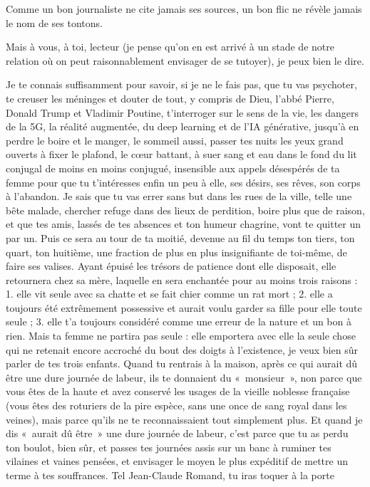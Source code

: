 Comme un bon journaliste ne cite jamais ses sources, un bon flic ne révèle jamais le nom de ses tontons.

Mais à vous, à toi, lecteur (je pense qu’on en est arrivé à un stade de notre relation où on peut raisonnablement envisager de se tutoyer), je peux bien le dire.

Je te connais suffisamment pour savoir, si je ne le fais pas, que tu vas psychoter, te creuser les méninges et douter de tout, y compris de Dieu, l’abbé Pierre, Donald Trump et Vladimir Poutine, t’interroger sur le sens de la vie, les dangers de la 5G, la réalité augmentée, du deep learning et de l’IA générative, jusqu’à en perdre le boire et le manger, le sommeil aussi, passer tes nuits les yeux grand ouverts à fixer le plafond, le cœur battant, à suer sang et eau dans le fond du lit conjugal de moins en moins conjugué, insensible aux appels désespérés de ta femme pour que tu t’intéresses enfin un peu à elle, ses désirs, ses rêves, son corps à l’abandon. Je sais que tu vas errer sans but dans les rues de la ville, telle une bête malade, chercher refuge dans des lieux de perdition, boire plus que de raison, et que tes amis, lassés de tes absences et ton humeur chagrine, vont te quitter un par un. Puis ce sera au tour de ta moitié, devenue au fil du temps ton tiers, ton quart, ton huitième, une fraction de plus en plus insignifiante de toi-même, de faire ses valises. Ayant épuisé les trésors de patience dont elle disposait, elle retournera chez sa mère, laquelle en sera enchantée pour au moins trois raisons : 1. elle vit seule avec sa chatte et se fait chier comme un rat mort ; 2. elle a toujours été extrêmement possessive et aurait voulu garder sa fille pour elle toute seule ; 3. elle t’a toujours considéré comme une erreur de la nature et un bon à rien. Mais ta femme ne partira pas seule : elle emportera avec elle la seule chose qui ne retenait encore accroché du bout des doigts à l’existence, je veux bien sûr parler de tes trois enfants. Quand tu rentrais à la maison, après ce qui aurait dû être une dure journée de labeur, ils te donnaient du «~monsieur~», non parce que vous êtes de la haute et avez conservé les usages de la vieille noblesse française (vous êtes des roturiers de la pire espèce, sans une once de sang royal dans les veines), mais parce qu’ils ne te reconnaissaient tout simplement plus. Et quand je dis «~aurait dû être~» une dure journée de labeur, c’est parce que tu as perdu ton boulot, bien sûr, et passes tes journées assis sur un banc à ruminer tes vilaines et vaines pensées, et envisager le moyen le plus expéditif de mettre un terme à tes souffrances. Tel Jean-Claude Romand, tu iras toquer à la porte 